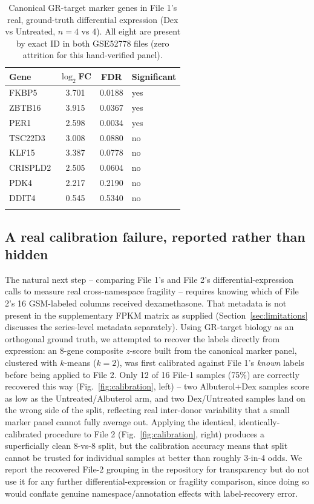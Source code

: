 \documentclass[webpdf,contemporary,large]{oup-authoring-template}
\theoremstyle{thmstyleone}%
\theoremstyle{thmstyletwo}%
\theoremstyle{thmstylethree}%
\begin{document}
\begin{table}[!t]
\caption{Canonical GR-target marker genes in File 1's real, ground-truth differential expression (Dex vs Untreated, $n=4$ vs $4$). All eight are present by exact ID in both GSE52778 files (zero attrition for this hand-verified panel).\label{tab:markerde}}
\begin{tabular*}{\columnwidth}{@{\extracolsep\fill}lccl@{\extracolsep\fill}}
\toprule
Gene & $\log_2$FC & FDR & Significant \\
\midrule
FKBP5    & 3.701 & 0.0188 & yes \\
ZBTB16   & 3.915 & 0.0367 & yes \\
PER1     & 2.598 & 0.0034 & yes \\
TSC22D3  & 3.008 & 0.0880 & no \\
KLF15    & 3.387 & 0.0778 & no \\
CRISPLD2 & 2.505 & 0.0604 & no \\
PDK4     & 2.217 & 0.2190 & no \\
DDIT4    & 0.545 & 0.5340 & no \\
\botrule
\end{tabular*}
\end{table}

\subsection{A real calibration failure, reported rather than hidden}\label{sec:real-calibration}

The natural next step -- comparing File 1's and File 2's differential-expression calls to measure real cross-namespace fragility -- requires knowing which of File 2's 16 GSM-labeled columns received dexamethasone. That metadata is not present in the supplementary FPKM matrix as supplied (Section~\ref{sec:limitations} discusses the series-level metadata separately). Using GR-target biology as an orthogonal ground truth, we attempted to recover the labels directly from expression: an 8-gene composite $z$-score built from the canonical marker panel, clustered with $k$-means ($k=2$), was first calibrated against File 1's \emph{known} labels before being applied to File 2. Only 12 of 16 File-1 samples (75\%) are correctly recovered this way (Fig.~\ref{fig:calibration}, left) -- two Albuterol+Dex samples score as low as the Untreated/Albuterol arm, and two Dex/Untreated samples land on the wrong side of the split, reflecting real inter-donor variability that a small marker panel cannot fully average out. Applying the identical, identically-calibrated procedure to File 2 (Fig.~\ref{fig:calibration}, right) produces a superficially clean 8-vs-8 split, but the calibration accuracy means that split cannot be trusted for individual samples at better than roughly 3-in-4 odds. We report the recovered File-2 grouping in the repository for transparency but do not use it for any further differential-expression or fragility comparison, since doing so would conflate genuine namespace/annotation effects with label-recovery error.
\end{document}
